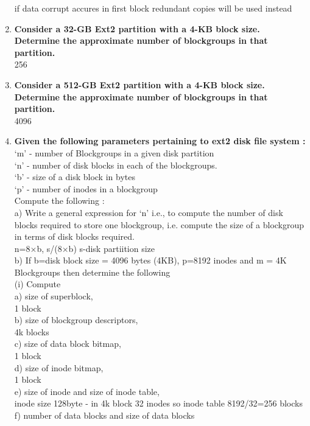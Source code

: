 \documentclass[a4paper,12pt]{article}
\begin{document}
\begin{flushleft}
\begin{enumerate}
{\color{red}if data corrupt accures in first block redundant copies will be used instead}\\
\item \textbf{ Consider a 32-GB Ext2 partition with a 4-KB block size. Determine the approximate number of blockgroups in that partition.}\\
{\color{red}256}\\
\item \textbf{ Consider a 512-GB Ext2 partition with a 4-KB block size. Determine the approximate number of blockgroups in that partition.}\\
{\color{red}4096}\\
\item \textbf{ Given the following parameters pertaining to ext2 disk file system :}\\
‘m’ - number of Blockgroups in a given disk partition\\
‘n’ - number of disk blocks in each of the blockgroups.\\
‘b’ - size of a disk block in bytes\\
‘p’ - number of inodes in a blockgroup\\
Compute the following :\\
a) Write a general expression for ‘n’ i.e., to compute the number of disk blocks required to store one blockgroup, i.e. compute the size of a blockgroup in terms of disk blocks required.
\\{\color{red}n=8$\times$b, s/(8$\times$b) s-disk partiition size}\\
b) If b=disk block size = 4096 bytes (4KB), p=8192 inodes and m = 4K Blockgroups then determine the following\\
(i) Compute\\
a) size of superblock,
\\{\color{red}1 block}\\
b) size of blockgroup descriptors,
\\{\color{red}4k blocks}\\
c) size of data block bitmap,
\\{\color{red}1 block}\\
d) size of inode bitmap,
\\{\color{red}1 block}\\
e) size of inode and size of inode table,
\\{\color{red}inode size 128byte - in 4k block 32 inodes so inode table  8192/32=256 blocks}\\
f) number of data blocks and size of data blocks

\end{enumerate}
\end{flushleft}
\end{document}
